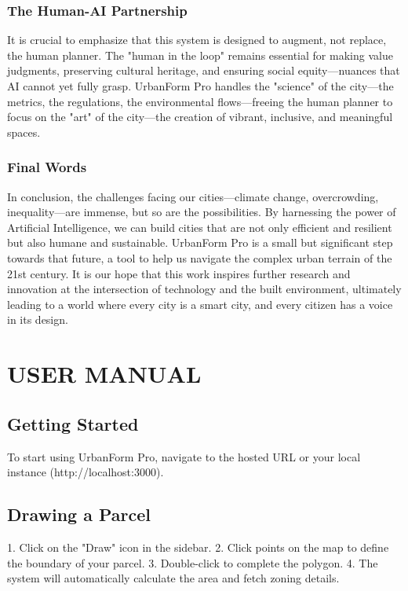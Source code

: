 \documentclass[12pt,a4paper]{report}
\begin{document}
\subsection{The Human-AI Partnership}
It is crucial to emphasize that this system is designed to augment, not replace, the human planner. The "human in the loop" remains essential for making value judgments, preserving cultural heritage, and ensuring social equity—nuances that AI cannot yet fully grasp. UrbanForm Pro handles the "science" of the city—the metrics, the regulations, the environmental flows—freeing the human planner to focus on the "art" of the city—the creation of vibrant, inclusive, and meaningful spaces.

\subsection{Final Words}
In conclusion, the challenges facing our cities—climate change, overcrowding, inequality—are immense, but so are the possibilities. By harnessing the power of Artificial Intelligence, we can build cities that are not only efficient and resilient but also humane and sustainable. UrbanForm Pro is a small but significant step towards that future, a tool to help us navigate the complex urban terrain of the 21st century. It is our hope that this work inspires further research and innovation at the intersection of technology and the built environment, ultimately leading to a world where every city is a smart city, and every citizen has a voice in its design.

\appendix
\chapter{USER MANUAL}
\section{Getting Started}
To start using UrbanForm Pro, navigate to the hosted URL or your local instance (http://localhost:3000).
\section{Drawing a Parcel}
1. Click on the "Draw" icon in the sidebar.
2. Click points on the map to define the boundary of your parcel.
3. Double-click to complete the polygon.
4. The system will automatically calculate the area and fetch zoning details.
\end{document}
